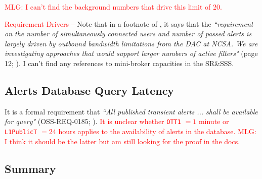 \documentclass[DM,authoryear,toc]{lsstdoc}
\begin{document}
\textcolor{red}{MLG: I can't find the background numbers that drive this limit of 20.}

\textcolor{red}{Requirement Drivers --} Note that in a footnote of , it says that the {\it ``requirement on the number of simultaneously connected users and number of passed alerts is largely driven by outbound bandwidth limitations from the DAC at NCSA. We are investigating approaches that would support larger numbers of active filters"} (page 12; ).  I can't find any references to mini-broker capacities in the SR\&SSS.


\subsection{Alerts Database Query Latency}

It is a formal requirement that {\it ``All published transient alerts ... shall be available for query"} (OSS-REQ-0185; ). \textcolor{red}{It is unclear whether {\tt OTT1} $=1$ minute or {\tt L1PublicT} $=24$ hours applies to the availability of alerts in the database. MLG: I think it should be the latter but am still looking for the proof in the docs.}




\subsection{Summary}


\clearpage


\end{document}
